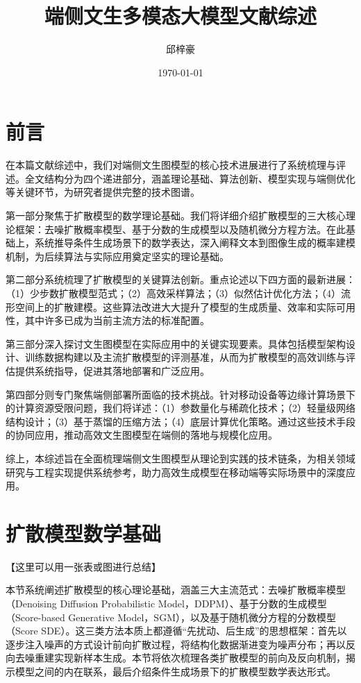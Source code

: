 \documentclass[11pt,a4paper,UTF8]{ctexart}
\title{端侧文生多模态大模型文献综述}
\author{邱梓豪}
\date{\today}
\begin{document}
\maketitle
\tableofcontents
\newpage

\section{前言}

在本篇文献综述中，我们对端侧文生图模型的核心技术进展进行了系统梳理与评述。全文结构分为四个递进部分，涵盖理论基础、算法创新、模型实现与端侧优化等关键环节，为研究者提供完整的技术图谱。

第一部分聚焦于扩散模型的数学理论基础。我们将详细介绍扩散模型的三大核心理论框架：去噪扩散概率模型、基于分数的生成模型以及随机微分方程方法。在此基础上，系统推导条件生成场景下的数学表达，深入阐释文本到图像生成的概率建模机制，为后续算法与实际应用奠定坚实的理论基础。

第二部分系统梳理了扩散模型的关键算法创新。重点论述以下四方面的最新进展：（1）少步数扩散模型范式；（2）高效采样算法；（3）似然估计优化方法；（4）流形空间上的扩散建模。这些算法改进大大提升了模型的生成质量、效率和实际可用性，其中许多已成为当前主流方法的标准配置。

第三部分深入探讨文生图模型在实际应用中的关键实现要素。具体包括模型架构设计、训练数据构建以及主流扩散模型的评测基准，从而为扩散模型的高效训练与评估提供系统指导，促进其落地部署和广泛应用。

第四部分则专门聚焦端侧部署所面临的技术挑战。针对移动设备等边缘计算场景下的计算资源受限问题，我们将详述：（1）参数量化与稀疏化技术；（2）轻量级网络结构设计；（3）基于蒸馏的压缩方法；（4）底层计算优化策略。通过这些技术手段的协同应用，推动高效文生图模型在端侧的落地与规模化应用。

综上，本综述旨在全面梳理端侧文生图模型从理论到实践的技术链条，为相关领域研究与工程实现提供系统参考，助力高效生成模型在移动端等实际场景中的深度应用。

\newpage

\section{扩散模型数学基础}

【这里可以用一张表或图进行总结】

本节系统阐述扩散模型的核心理论基础，涵盖三大主流范式：去噪扩散概率模型（Denoising Diffusion Probabilistic Model，DDPM）\cite{sohldickstein2015diffusion,ho2020denoising}、基于分数的生成模型（Score-based Generative Model，SGM）\cite{song2019generative,song2020improved}，以及基于随机微分方程的分数模型（Score SDE）\cite{song2020score,karras2022elucidating}。这三类方法本质上都遵循“先扰动、后生成”的思想框架：首先以逐步注入噪声的方式设计前向扩散过程，将结构化数据渐进变为噪声分布；再以反向去噪重建实现新样本生成。本节将依次梳理各类扩散模型的前向及反向机制，揭示模型之间的内在联系，最后介绍条件生成场景下的扩散模型数学表达形式。
\end{document}
